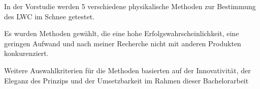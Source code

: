 
In der Vorstudie werden 5 verschiedene physikalische Methoden zur Bestimmung des LWC im Schnee getestet.

Es wurden Methoden gewählt, die eine hohe Erfolgswahrscheinlichkeit, eine geringen Aufwand und nach meiner Recherche nicht mit anderen Produkten konkurenziert.

Weitere Auswahlkriterien für die Methoden basierten auf der Innovativität, der Eleganz des Prinzips und der Umsetzbarkeit im Rahmen dieser Bachelorarbeit
